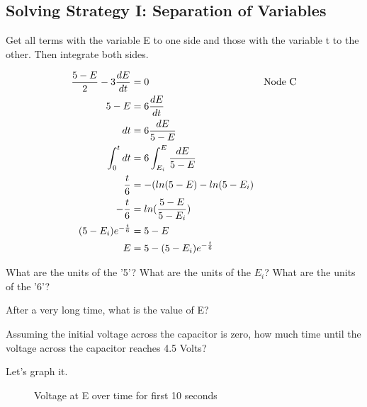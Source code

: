 \subsection{Solving Strategy I: Separation of Variables}
Get all terms with the variable E to one side and those with the variable t to the other. Then integrate both sides.

\begin{align}
\frac{5-E}{2}-3\frac{dE}{dt}&=0 &\text{Node C} \notag\\
5-E&=6\frac{dE}{dt}\notag\\
dt &=6\frac{dE}{5-E}\notag\\
\int_0^{t} dt &= 6\int_{E_i}^{E} \frac{dE}{5-E} \notag\\
\frac{t}{6}&= -(ln(5-E)-ln(5-E_i)\notag\\
-\frac{t}{6}&=ln(\frac{5-E}{5-E_i})\notag\\
(5-E_i)e^{-\frac{t}{6}}&=5-E\notag\\
E&=5-(5-E_i)e^{-\frac{t}{6}} \label{E:6RCSOL}
\end{align}

\begin{alevel}
What are the units of the '5'? What are the units of the $E_i$? What are the units of the '6'?
\end{alevel}

\begin{blevel}
After a very long time, what is the value of E?
\end{blevel}

\begin{blevel}
Assuming the initial voltage across the capacitor is zero, how much time until the voltage across the capacitor reaches 4.5 Volts?
\end{blevel}

Let's graph it.

\par
\begin{figure}[H]
\begin{center}
\caption{Voltage at E over time for first 10 seconds}
\end{center}
\end{figure}

